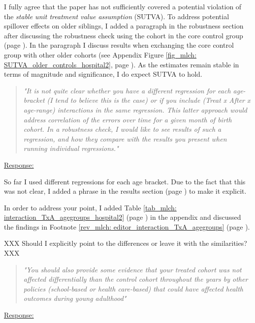 I fully agree that the paper has not sufficiently covered a potential violation of the \textit{stable unit treatment value assumption} (SUTVA). To address potential spillover effects on older siblings, I added a paragraph in the robustness section after discussing the robustness check using the cohort in the core control group (page \pageref{rev_mlch: editor_SUTVA_older_cohorts}). In the paragraph I discuss results when exchanging the core control group with other older cohorts (see Appendix Figure \ref{fig_mlch: SUTVA_older_controls_hospital2}, page \pageref{fig_mlch: SUTVA_older_controls_hospital2}). As the estimates remain stable in terms of magnitude and significance, I do expect SUTVA to hold.



\bigskip
\begin{quote}
	\textit{"It is not quite clear whether you have a different regression for each age-bracket (I tend to believe this is the case) or if you include (Treat x After x age-range) interactions in the same regression. This latter approach would address correlation of the errors over time for a given month of birth cohort. In a robustness check, I would like to see results of such a regression, and how they compare with the results you present when running individual regressions."}
\end{quote}
\underline{Response:}


So far I used different regressions for each age bracket. Due to the fact that this was not clear, I added a phrase in the results section (page \pageref{rev_mlch: editor_comprehension_interaction}) to make it explicit.

In order to address your point, I added Table \ref{tab_mlch: interaction_TxA_agegroups_hospital2} (page \pageref{tab_mlch: interaction_TxA_agegroups_hospital2}) in the appendix and discussed the findings in Footnote \ref{rev_mlch: editor_interaction_TxA_agegroups} (page \pageref{rev_mlch: editor_interaction_TxA_agegroups}).

XXX Should I explicitly point to the differences or leave it with the similarities? XXX





\bigskip
\begin{quote}
	\textit{"You should also provide some evidence that your treated cohort was not affected differentially than the control cohort throughout the years by other policies (school-based or health care-based) that could have affected health outcomes during young adulthood"}
\end{quote}
\underline{Response:}











